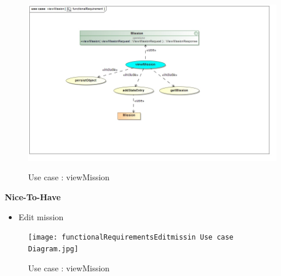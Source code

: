 \documentclass{article}
\begin{document}
\begin{flushleft}
				\begin{figure}[H]
					\includegraphics[width=\textwidth]{functionalRequirement_viewmission.jpg}  \\
					\caption{Use case : viewMission}
				\end{figure}

			\textbf{Nice-To-Have}
				\begin{itemize}
	  				\item Edit mission
				\end{itemize}
				
				\begin{figure}[H]
					\texttt{[image: functionalRequirementsEditmissin Use case Diagram.jpg]}  \\
					\caption{Use case : viewMission}
				\end{figure}
		\end{flushleft}
\end{document}
